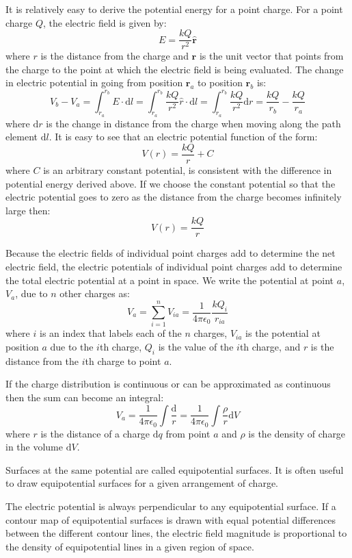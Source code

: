 \documentclass[../introphysics.tex]{subfiles}
\begin{document}
It is relatively easy to derive the potential energy for a point charge. 
For a point charge $Q$, the electric field is given by:
\[E=\frac{kQ}{r^2}\hat{\textbf{r}}\]
where $r$ is the distance from the charge and $\textbf{r}$ is the unit vector
that points from the charge to the point at which the electric field is being evaluated.
The change in electric potential in going from position $\textbf{r}_a$ to position $\textbf{r}_b$ is:
\[V_b-V_a=\int_{r_a}^{r_b}E\cdot\mathrm{d}l=\int_{r_a}^{r_b}\frac{kQ}{r^2}\hat{r}\cdot\mathrm{d}l=\int_{r_a}^{r_b}\frac{kQ}{r^2}\mathrm{d}r=\frac{kQ}{r_b}-\frac{kQ}{r_a}\]
where $\mathrm{d}r$ is the change in distance from the charge when moving along the path element $\mathrm{d}l$.
It is easy to see that an electric potential function of the form:
\[V(r)=\frac{kQ}{r}+C\]
where $C$ is an arbitrary constant potential, is consistent with the difference
in potential energy derived above. If we choose the constant potential so that the electric 
potential goes to zero as the distance from the charge becomes infinitely large then:
\[V(r)=\frac{kQ}{r}\]

Because the electric fields of individual point charges add to determine the net
electric field, the electric potentials of individual point charges add to determine 
the total electric potential at a point in space. We write the potential at 
point $a$, $V_a$, due to $n$ other charges as:
\[V_a=\sum^n_{i=1}V_{ia}=\frac{1}{4\pi\epsilon_0}\frac{kQ_i}{r_{ia}}\]
where $i$ is an index that labels each of the $n$ charges, $V_{ia}$ is the potential at 
position $a$ due to the $i$th charge, $Q_i$ is the value of the $i$th charge,
and $r$ is the distance from the $i$th charge to point $a$.

If the charge distribution is continuous or can be approximated as continuous 
then the sum can become an integral:
\[V_a=\frac{1}{4\pi\epsilon_0}\int \frac{\mathrm{d}}{r}=\frac{1}{4\pi\epsilon_0}\int \frac{\rho}{r}\mathrm{d}V\]
where $r$ is the distance of a charge $\mathrm{d}q$ from point $a$ and $\rho$ 
is the density of charge in the volume $\mathrm{d}V$.

Surfaces at the same potential are called equipotential surfaces. It is often useful
to draw equipotential surfaces for a given arrangement of charge.

The electric potential is always perpendicular to any equipotential surface. 
If a contour map of equipotential surfaces is drawn with equal potential differences
between the different contour lines, the electric field magnitude is proportional
to the density of equipotential lines in a given region of space.
\end{document}
